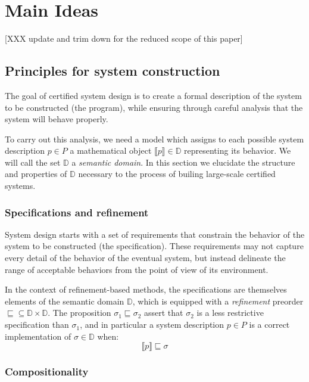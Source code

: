 \documentclass{article}
\begin{document}


\section{Main Ideas} %

[XXX update and trim down for the reduced scope of this paper]

\subsection{Principles for system construction}

The goal of certified system design is
to create a formal description of
the system to be constructed (the program),
while ensuring through careful analysis that the system
will behave properly.

To carry out this analysis,
we need a model
which assigns to each possible system description $p \in P$
a mathematical object $\llbracket p \rrbracket \in \mathbb{D}$
representing its behavior.
We will call the set $\mathbb{D}$ a \emph{semantic domain}.
In this section we elucidate
the structure and properties of $\mathbb{D}$
necessary to the process of builing
large-scale certified systems.

\subsubsection{Specifications and refinement}

System design starts with a set of requirements
that constrain the behavior of the system to be constructed
(the specification).
These requirements may not capture every detail
of the behavior of the eventual system,
but instead delineate the range of acceptable behaviors
from the point of view of its environment.

In the context of refinement-based methods,
the specifications are themselves elements of
the semantic domain $\mathbb{D}$,
which is equipped with a \emph{refinement} preorder
${\sqsubseteq} \subseteq \mathbb{D} \times \mathbb{D}$.
The proposition $\sigma_1 \sqsubseteq \sigma_2$
assert that $\sigma_2$ is a less restrictive specification than $\sigma_1$,
and in particular a system description $p \in P$ is a correct implementation
of $\sigma \in \mathbb{D}$ when:
\[ \llbracket p \rrbracket \sqsubseteq \sigma \]

\subsubsection{Compositionality}
\end{document}
